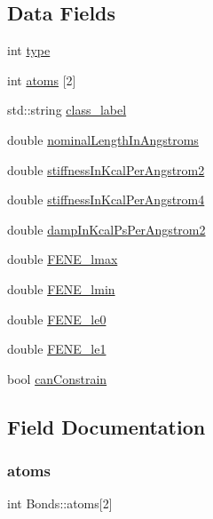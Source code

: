 \subsection*{Data Fields}
\begin{DoxyCompactItemize}
\item 
int \mbox{\hyperlink{structBonds_a888b86b64e111ca2c1cdc57ab3f1e575}{type}}
\item 
int \mbox{\hyperlink{structBonds_a8a34bb278b19d3695b27e9863025b9ff}{atoms}} \mbox{[}2\mbox{]}
\item 
std\+::string \mbox{\hyperlink{structBonds_aa2ab521cee97c73716b5fec929486a84}{class\+\_\+label}}
\item 
double \mbox{\hyperlink{structBonds_ae3486b916a2b9b1b850441062503f3b3}{nominal\+Length\+In\+Angstroms}}
\item 
double \mbox{\hyperlink{structBonds_a9b3712d34cadf4b451349b0ac76597d5}{stiffness\+In\+Kcal\+Per\+Angstrom2}}
\item 
double \mbox{\hyperlink{structBonds_a0780dfadea7787128aca962f5e5c57a1}{stiffness\+In\+Kcal\+Per\+Angstrom4}}
\item 
double \mbox{\hyperlink{structBonds_a87353d3d4bd3c21c04cbc2918ae0ae91}{damp\+In\+Kcal\+Ps\+Per\+Angstrom2}}
\item 
double \mbox{\hyperlink{structBonds_a63e86c906c80c0cdee48220ca47d8699}{F\+E\+N\+E\+\_\+lmax}}
\item 
double \mbox{\hyperlink{structBonds_aac40730c3bc80ea9331a7be2e5c4cfe4}{F\+E\+N\+E\+\_\+lmin}}
\item 
double \mbox{\hyperlink{structBonds_a4fe207829fdd685735e9ab4e91bb7567}{F\+E\+N\+E\+\_\+le0}}
\item 
double \mbox{\hyperlink{structBonds_a19217ee754badd8854095ec67df90df9}{F\+E\+N\+E\+\_\+le1}}
\item 
bool \mbox{\hyperlink{structBonds_a2bb39aa55db302247ccb0e058c03bf63}{can\+Constrain}}
\end{DoxyCompactItemize}


\subsection{Field Documentation}
\mbox{\label{structBonds_a8a34bb278b19d3695b27e9863025b9ff}} 
\subsubsection{\texorpdfstring{atoms}{atoms}}
{\footnotesize\ttfamily int Bonds\+::atoms\mbox{[}2\mbox{]}}

